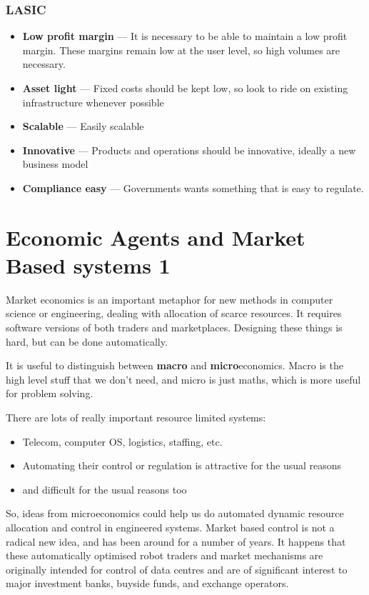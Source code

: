 \documentclass[11pt,a4paper,titlepage,dvipsnames,cmyk]{scrartcl}
\begin{document}
\subsubsection{LASIC}
\begin{itemize}
    \item \textbf{Low profit margin} --- It is necessary to be able to maintain a low profit margin. These margins remain low at the user level, so high volumes are necessary.
    \item \textbf{Asset light} --- Fixed costs should be kept low, so look to ride on existing infrastructure whenever possible
    \item \textbf{Scalable} --- Easily scalable
    \item \textbf{Innovative} --- Products and operations should be innovative, ideally a new business model
    \item \textbf{Compliance easy} --- Governments wants something that is easy to regulate.
\end{itemize}

\section{Economic Agents and Market Based systems 1}
Market economics is an important metaphor for new methods in computer science or engineering, dealing with allocation of scarce resources. It requires software versions of both traders and marketplaces. Designing these things is hard, but can be done automatically. 

It is useful to distinguish between \textbf{macro} and \textbf{micro}economics. Macro is the high level stuff that we don't need, and micro is just maths, which is more useful for problem solving.

There are lots of really important resource limited systems:
\begin{itemize}
    \item Telecom, computer OS, logistics, staffing, etc.
    \item Automating their control or regulation is attractive for the usual reasons
    \item and difficult for the usual reasons too
\end{itemize}

So, ideas from microeconomics could help us do automated dynamic resource allocation and control in engineered systems. Market based control is not a radical new idea, and has been around for a number of years. It happens that these automatically optimised robot traders and market mechanisms are originally intended for control of data centres and are of significant interest to major investment banks, buyside funds, and exchange operators.
\end{document}
